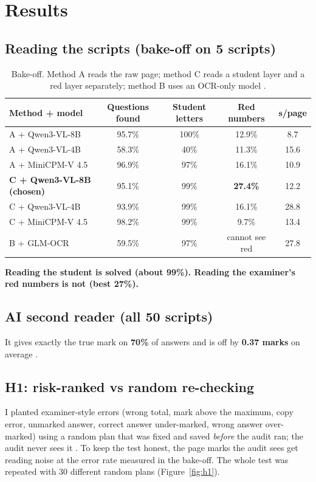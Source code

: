 \section{Results}

\subsection{Reading the scripts (bake-off on 5 scripts)}
\begin{table}[H]
\centering
\small
\caption[Bake-off. Method A reads the raw page; method C reads a student layer and a red layer separately; method B uses an
OCR-only model.]{Bake-off. Method A reads the raw page; method C reads a student layer and a red layer separately; method B uses an
OCR-only model .}
\label{tab:bakeoff}
\begin{tabular}{@{}lcccc@{}}
\toprule
\textbf{Method + model} & \textbf{Questions found} & \textbf{Student letters} & \textbf{Red numbers} & \textbf{s/page} \\
\midrule
A + Qwen3-VL-8B & 95.7\% & 100\% & 12.9\% & 8.7 \\
A + Qwen3-VL-4B & 58.3\% & 40\% & 11.3\% & 15.6 \\
A + MiniCPM-V 4.5 & 96.9\% & 97\% & 16.1\% & 10.9 \\
\textbf{C + Qwen3-VL-8B (chosen)} & 95.1\% & 99\% & \textbf{27.4\%} & 12.2 \\
C + Qwen3-VL-4B & 93.9\% & 99\% & 16.1\% & 28.8 \\
C + MiniCPM-V 4.5 & 98.2\% & 99\% & 9.7\% & 13.4 \\
B + GLM-OCR & 59.5\% & 97\% & cannot see red & 27.8 \\
\bottomrule
\end{tabular}
\end{table}
\textbf{Reading the student is solved (about 99\%). Reading the examiner's red numbers is not (best 27\%).}

\subsection{AI second reader (all 50 scripts)}
It gives exactly the true mark on \textbf{70\%} of answers and is off by \textbf{0.37 marks} on average .

\subsection{H1: risk-ranked vs random re-checking}
I planted examiner-style errors (wrong total, mark above the maximum, copy error, unmarked answer, correct answer
under-marked, wrong answer over-marked) using a random plan that was fixed and saved \emph{before} the audit ran; the audit
never sees it . To keep the test honest, the page marks the audit sees get reading noise at the error rate
measured in the bake-off. The whole test was repeated with 30 different random plans (Figure~\ref{fig:h1}).

